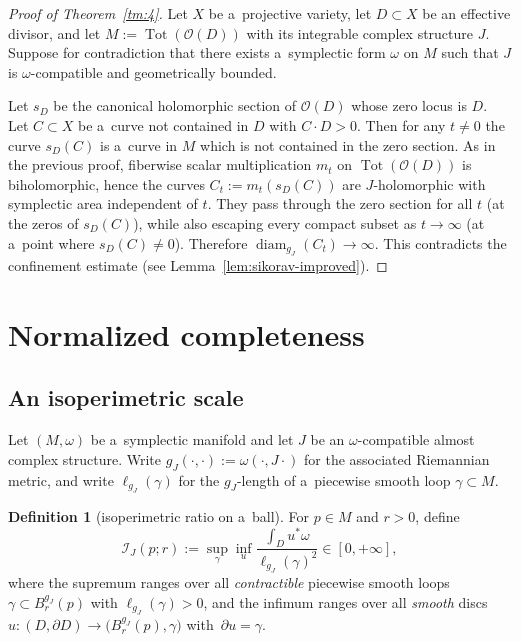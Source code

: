 \documentclass[pdftex]{sigma}
\numberwithin{equation}{section}
\DeclareMathOperator{\diam}{diam}
\DeclareMathOperator{\Tot}{Tot}
\theoremstyle{definition}
\newtheorem{df}[Theorem]{Definition}
\begin{document}
\begin{proof}[Proof of Theorem~\ref{tm:4}]
Let $X$ be a~projective variety, let $D\subset X$ be an effective divisor, and let $M:=\Tot(\mathcal{O}(D))$ with its integrable complex structure $J$.
Suppose for contradiction that there exists a~symplectic form $\omega$ on $M$ such that $J$ is $\omega$-compatible and geometrically bounded.

Let $s_D$ be the canonical holomorphic section of $\mathcal{O}(D)$ whose zero locus is $D$.
Let $C\subset X$ be a~curve not contained in $D$ with $C\cdot D>0$. Then for any $t\neq 0$ the curve $s_D(C)$ is a~curve in $M$ which is not contained in the zero section. As in the previous proof, fiberwise scalar multiplication $m_t$ on $\Tot(\mathcal{O}(D))$ is biholomorphic, hence the curves $C_t:=m_t(s_D(C))$ are $J$-holomorphic with symplectic area independent of $t$. They pass through the zero section for all $t$ (at the zeros of $s_D(C)$), while also escaping every compact subset as $t\to\infty$ (at a~point where $s_D(C)\neq 0$). Therefore $\diam_{g_J}(C_t)\to\infty$. This contradicts the confinement estimate (see Lemma~\ref{lem:sikorav-improved}).
\end{proof}

\section{Normalized completeness}\label{sec:norm-complete}
\subsection{An isoperimetric scale}\label{subsec:isoperimetric-scale}
Let $(M,\omega)$ be a~symplectic manifold and let $J$ be an $\omega$-compatible almost complex structure.
Write
$
g_J(\cdot,\cdot):=\omega(\cdot,J\cdot)
$
for the associated Riemannian metric, and write $\ell_{g_J}(\gamma)$ for the $g_J$-length of a~piecewise smooth loop $\gamma\subset M$.

\begin{df}[isoperimetric ratio on a~ball]\label{df:isoperimetric-ratio}
For $p\in M$ and $r>0$, define
\[
\mathcal{I}_J(p;r)
:=
\sup_{\gamma}
\inf_{u}
\frac{\int_D u^*\omega}{\ell_{g_J}(\gamma)^2} \in[0,+\infty],
\]
where the supremum ranges over all \emph{contractible} piecewise smooth loops $\gamma\subset B^{g_J}_r(p)$ with $\ell_{g_J}(\gamma)>0$, and the infimum ranges over all \emph{smooth} discs $u\colon (D,\partial D)\to \bigl(B^{g_J}_r(p),\gamma\bigr)$ with~${\partial u=\gamma}$.
\end{df}
\end{document}
